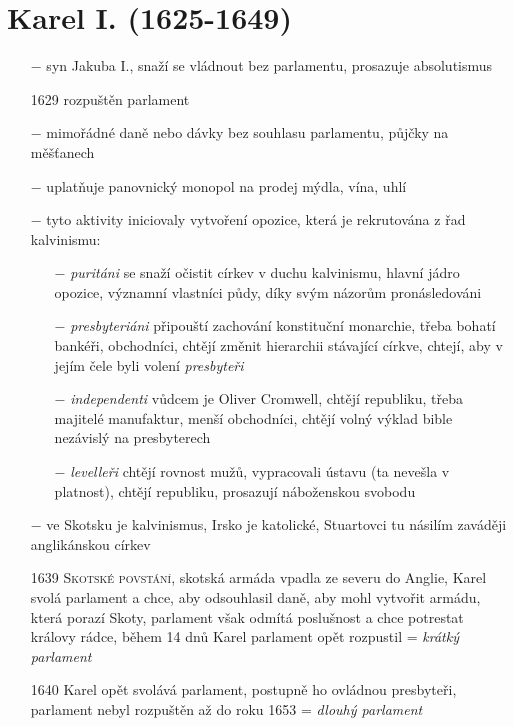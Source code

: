 \documentclass{article}
\begin{document}
\section*{Karel I. (1625-1649)}
\begin{itemize}
    \vspace{-0.5em}
    \setlength\itemsep{0.15em}
    \item[$-$] syn Jakuba I., snaží se vládnout bez parlamentu, prosazuje absolutismus
    \item[1629] rozpuštěn parlament
    \item[$-$] mimořádné daně nebo dávky bez souhlasu parlamentu, půjčky na měšťanech
    \item[$-$] uplatňuje panovnický monopol na prodej mýdla, vína, uhlí
    \item[$-$] tyto aktivity iniciovaly vytvoření opozice, která je rekrutována z řad kalvinismu:
    \begin{itemize}
        \vspace{-0.5em}
        \setlength\itemsep{0.15em}
        \item[$-$] \textit{puritáni} se snaží očistit církev v duchu kalvinismu, hlavní jádro opozice, významní vlastníci půdy, díky svým názorům pronásledováni
        \item[$-$] \textit{presbyteriáni} připouští zachování konstituční monarchie, třeba bohatí bankéři, obchodníci, chtějí změnit hierarchii stávající církve, chtejí, aby v jejím čele byli volení \textit{presbyteři}
        \item[$-$] \textit{independenti} vůdcem je Oliver Cromwell, chtějí republiku, třeba majitelé manufaktur, menší obchodníci, chtějí volný výklad bible nezávislý na presbyterech
        \item[$-$] \textit{levelleři} chtějí rovnost mužů, vypracovali ústavu (ta nevešla v platnost), chtějí republiku, prosazují náboženskou svobodu
    \end{itemize}
    \item[$-$] ve Skotsku je kalvinismus, Irsko je katolické, Stuartovci tu násilím zaváději anglikánskou církev
    \item[1639] \textsc{Skotské povstání}, skotská armáda vpadla ze severu do Anglie, Karel svolá parlament a chce, aby odsouhlasil daně, aby mohl vytvořit armádu, která porazí Skoty, parlament však odmítá poslušnost a chce potrestat královy rádce, během 14 dnů Karel parlament opět rozpustil = \textit{krátký parlament}
    \item[1640] Karel opět svolává parlament, postupně ho ovládnou presbyteři, parlament nebyl rozpuštěn až do roku 1653 = \textit{dlouhý parlament}

\end{itemize}
\end{document}
